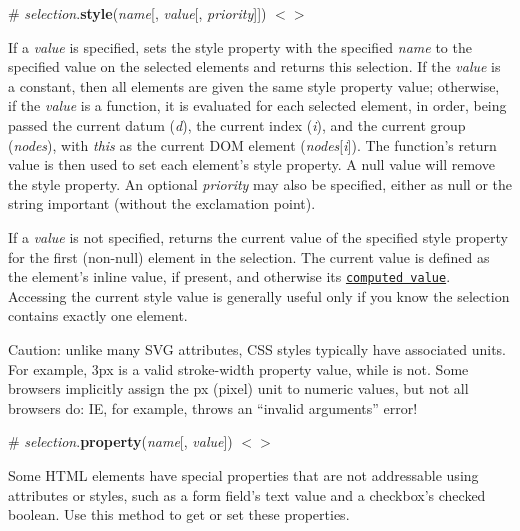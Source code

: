 \label{_selection_style}%
\# {\itshape selection}.{\bfseries style}({\itshape name}\mbox{[}, {\itshape value}\mbox{[}, {\itshape priority}\mbox{]}\mbox{]}) \href{https://github.com/d3/d3-selection/blob/master/src/selection/style.js}{\tt $<$$>$}

If a {\itshape value} is specified, sets the style property with the specified {\itshape name} to the specified value on the selected elements and returns this selection. If the {\itshape value} is a constant, then all elements are given the same style property value; otherwise, if the {\itshape value} is a function, it is evaluated for each selected element, in order, being passed the current datum ({\itshape d}), the current index ({\itshape i}), and the current group ({\itshape nodes}), with {\itshape this} as the current D\+OM element ({\itshape nodes}\mbox{[}{\itshape i}\mbox{]}). The function’s return value is then used to set each element’s style property. A null value will remove the style property. An optional {\itshape priority} may also be specified, either as null or the string {\ttfamily important} (without the exclamation point).

If a {\itshape value} is not specified, returns the current value of the specified style property for the first (non-\/null) element in the selection. The current value is defined as the element’s inline value, if present, and otherwise its \href{https://developer.mozilla.org/en-US/docs/Web/CSS/computed_value}{\tt computed value}. Accessing the current style value is generally useful only if you know the selection contains exactly one element.

Caution\+: unlike many S\+VG attributes, C\+SS styles typically have associated units. For example, {\ttfamily 3px} is a valid stroke-\/width property value, while {} is not. Some browsers implicitly assign the {\ttfamily px} (pixel) unit to numeric values, but not all browsers do\+: IE, for example, throws an “invalid arguments” error!

\label{_selection_property}%
\# {\itshape selection}.{\bfseries property}({\itshape name}\mbox{[}, {\itshape value}\mbox{]}) \href{https://github.com/d3/d3-selection/blob/master/src/selection/property.js}{\tt $<$$>$}

Some H\+T\+ML elements have special properties that are not addressable using attributes or styles, such as a form field’s text {\ttfamily value} and a checkbox’s {\ttfamily checked} boolean. Use this method to get or set these properties.

